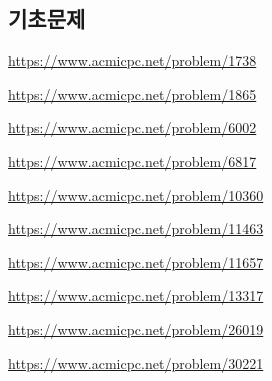 \subsection{기초문제}
\begin{problem} \url{https://www.acmicpc.net/problem/1738} \end{problem}
\begin{problem} \url{https://www.acmicpc.net/problem/1865} \end{problem}
\begin{problem} \url{https://www.acmicpc.net/problem/6002} \end{problem}
\begin{problem} \url{https://www.acmicpc.net/problem/6817} \end{problem}
\begin{problem} \url{https://www.acmicpc.net/problem/10360} \end{problem}
\begin{problem} \url{https://www.acmicpc.net/problem/11463} \end{problem}
\begin{problem} \url{https://www.acmicpc.net/problem/11657} \end{problem}
\begin{problem} \url{https://www.acmicpc.net/problem/13317} \end{problem}
\begin{problem} \url{https://www.acmicpc.net/problem/26019} \end{problem}
\begin{problem} \url{https://www.acmicpc.net/problem/30221} \end{problem}

